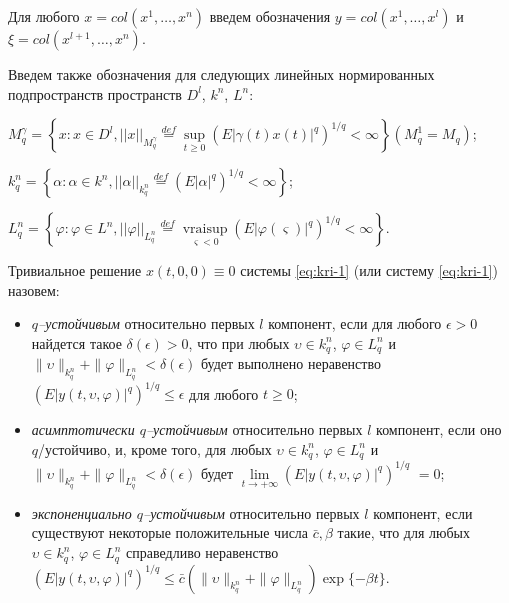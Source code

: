 Для любого $x = col (x^1, \dots, x^n)$ введем обозначения $y =  col
(x^1, \dots, x^l)$ и \\$\xi = col (x^{l+1                   }, \dots,
x^n)$.

Введем также обозначения для следующих линейных нормированных
подпространств пространств $D^l$, $k^n$, $L^n$:

$ M_q^{\gamma } = \left \{x: x \in D^l, ||x||_{M_q^\gamma }
 \mathrel
 {\mathop {=} \limits ^{def}} \mathrel {\mathop {\sup}
 \limits _{t
 \ge 0}} (E|\gamma (t)x(t)|^q)^{1/q} < \infty \right \}  (
 M_q^1 = M_q)$;

$ k_q^n = \left \{\alpha: \alpha \in k^n, ||\alpha ||_{k_q^n}
 \mathrel
 {\mathop {=} \limits ^{def}} (E|\alpha |^q)^{1/q} < \infty
 \right  \}$;

 $L_q^n = \left \{\varphi: \varphi \in L^n,
 ||\varphi||_{L_q^n}
 \mathrel {\mathop {=} \limits ^{def}} \mathrel {\mathop
 {vrai \sup}
 \limits _{\varsigma < 0}}(E|\varphi (\varsigma ) |^q)^{1/q} < \infty
 \right \}$.


\begin{definition}\label{def:kri-2}
    Тривиальное решение $x(t,0, 0)\equiv 0$
    системы \eqref{eq:kri-1} (или систему \eqref{eq:kri-1}) назовем:
    
    \begin{itemize}
        \item {\it $q$--устойчивым} относительно первых $l$ компонент, если
        для любого $\epsilon > 0$ найдется такое $\delta (\epsilon) > 0$,
        что при любых $\upsilon \in k^n_q$, $\varphi \in L^n_q$ и
        $\|\upsilon\|_{k^n_q} + \|\varphi \|_{L^n_q} < \delta (\epsilon)$
        будет выполнено неравенство $(E|y(t,\upsilon, \varphi)|^q)^{1/q} \le
        \epsilon $ для любого $t \ge 0$;
        
        \item {\it асимптотически $q$--устойчивым }относительно первых $l$ компонент, если
        оно $q$\-/устойчиво, и, кроме того, для любых $\upsilon \in
        k^n_q$, $\varphi \in L^n_q$ и $\|\upsilon\|_{k^n_q} + \|\varphi
        \|_{L^n_q} < \delta (\epsilon)$ будет $\lim \limits_{t  \rightarrow
        +\infty }(E|y(t,\upsilon, \varphi)|^q)^{1/q}$ $ = 0$;
        
        \item {\it экспоненциально $q$--устойчивым }относительно первых $l$ компонент, если
        существуют некоторые положительные числа $\bar c, \beta$ такие, что
        для любых $\upsilon \in k^n_q$, $\varphi \in L^n_q$ справедливо
        неравенство $(E|y(t,\upsilon, \varphi)|^q)^{1/q} \le \bar
        c\left(\|\upsilon\|_{k^n_q} + \|\varphi \|_{L^n_q}\right)\exp
        \{-\beta t\}$.
    \end{itemize}
\end{definition}

